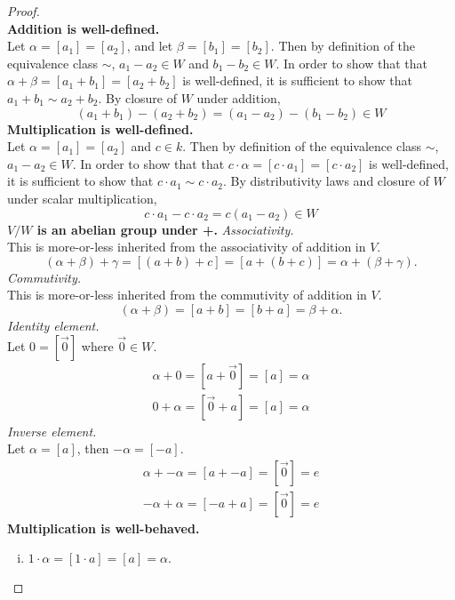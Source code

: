 \documentclass{article}
\begin{document}
\begin{proof} \text{} \\
  \textbf{Addition is well-defined.}\\
    Let $\alpha = [a_1] = [a_2]$, and let $\beta = [b_1] = [b_2]$.
    Then by definition of the equivalence class
    $\sim$, $a_1 - a_2 \in W$ and $b_1 - b_2 \in W$. In order to show that
    that $\alpha + \beta = [a_1 + b_1] = [a_2 + b_2]$ is well-defined, it is
    sufficient to show that $a_1 + b_1 \sim a_2 + b_2$. By closure of $W$ under
    addition,
    \[
      (a_1 + b_1) - (a_2 + b_2) = (a_1 - a_2) - (b_1 - b_2) \in W
    \]
%
  \textbf{Multiplication is well-defined.}\\
    Let $\alpha = [a_1] = [a_2]$ and $c \in k$.
    Then by definition of the equivalence class
    $\sim$, $a_1 - a_2 \in W$. In order to show that
    that $c \cdot \alpha = [c\cdot a_1] = [c\cdot a_2]$ is well-defined, it is
    sufficient to show that $c\cdot a_1 \sim c\cdot a_2$. By
    distributivity laws and closure of $W$ under scalar multiplication,
    \[
      c\cdot a_1 - c\cdot a_2 = c(a_1 - a_2) \in W
    \]
%
  \textbf{$V/W$ is an abelian group under +.}
  \textit{Associativity.}\\
  This is more-or-less inherited from the associativity of addition in $V$. \[
    (\alpha + \beta) + \gamma
      = [(a + b) + c]
      = [a + (b + c)]
      = \alpha + (\beta + \gamma).
  \]
  \textit{Commutivity.}\\
  This is more-or-less inherited from the commutivity of addition in $V$. \[
    (\alpha + \beta)
      = [a + b]
      = [b + a]
      = \beta + \alpha.
  \]
  \textit{Identity element.}\\
  Let $0 = [\vec{0}]$ where $\vec{0} \in W$. \begin{align*}
    \alpha + 0 = [a + \vec{0}] = [a] = \alpha\\
    0 + \alpha = [\vec{0} + a] = [a] = \alpha
  \end{align*}
  \textit{Inverse element.}\\
  Let $\alpha = [a]$, then $-\alpha = [-a]$. \begin{align*}
    \alpha + -\alpha = [a + -a] = [\vec{0}] = e\\
    -\alpha + \alpha = [-a + a] = [\vec{0}] = e
  \end{align*}
%
  \textbf{Multiplication is well-behaved.}\\
  \begin{enumerate}[(i)]
    \item $1 \cdot \alpha = [1 \cdot a] = [a] = \alpha.$

\end{enumerate}
\end{proof}
\end{document}

